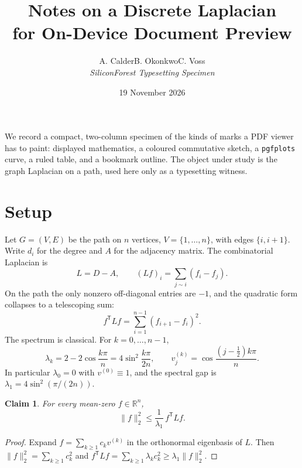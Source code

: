 \documentclass[10pt,twocolumn]{article}
\title{\textcolor{sfblue}{Notes on a Discrete Laplacian}\\[2pt]
\large for On-Device Document Preview}
\author{A. Calder\quad B. Okonkwo\quad C. Voss\\[2pt]
\normalsize\textit{SiliconForest Typesetting Specimen}}
\date{19 November 2026}
\newtheorem{claim}{Claim}
\theoremstyle{definition}
\begin{document}
\maketitle
\thispagestyle{plain}

\begin{tcolorbox}[colback=sfpanel,colframe=sfblue,title=Abstract,fonttitle=\bfseries]
We record a compact, two-column specimen of the kinds of marks a PDF viewer has to paint: displayed mathematics, a coloured commutative sketch, a \texttt{pgfplots} curve, a ruled table, and a bookmark outline. The object under study is the graph Laplacian on a path, used here only as a typesetting witness.
\end{tcolorbox}

\tableofcontents
\bigskip

\section{Setup}
\label{sec:setup}
Let \(G=(V,E)\) be the path on \(n\) vertices, \(V=\{1,\ldots,n\}\), with edges \(\{i,i+1\}\). Write \(d_i\) for the degree and \(A\) for the adjacency matrix. The combinatorial Laplacian is
\begin{equation}
\label{eq:lap}
L = D - A, \qquad (Lf)_i = \sum_{j\sim i}(f_i-f_j).
\end{equation}
On the path the only nonzero off-diagonal entries are \(-1\), and the quadratic form collapses to a telescoping sum:
\begin{equation}
\label{eq:energy}
f^{\mathsf T} L f = \sum_{i=1}^{n-1} (f_{i+1}-f_i)^2.
\end{equation}
The spectrum is classical. For \(k=0,\ldots,n-1\),
\begin{equation}
\label{eq:spectrum}
\lambda_k = 2-2\cos\frac{k\pi}{n} = 4\sin^2\frac{k\pi}{2n},
\qquad
v^{(k)}_j = \cos\frac{(j-\tfrac12)k\pi}{n}.
\end{equation}
In particular \(\lambda_0=0\) with \(v^{(0)}\equiv 1\), and the spectral gap is \(\lambda_1=4\sin^2(\pi/(2n))\).

\begin{claim}
\label{clm:gap}
For every mean-zero \(f\in\mathbb{R}^n\),
\[
\|f\|_2^2 \le \frac{1}{\lambda_1}\, f^{\mathsf T} L f.
\]
\end{claim}

\begin{proof}
Expand \(f=\sum_{k\ge 1} c_k v^{(k)}\) in the orthonormal eigenbasis of \(L\). Then \(\|f\|_2^2=\sum_{k\ge 1} c_k^2\) and \(f^{\mathsf T}Lf=\sum_{k\ge 1}\lambda_k c_k^2\ge\lambda_1\|f\|_2^2\).
\end{proof}
\end{document}
